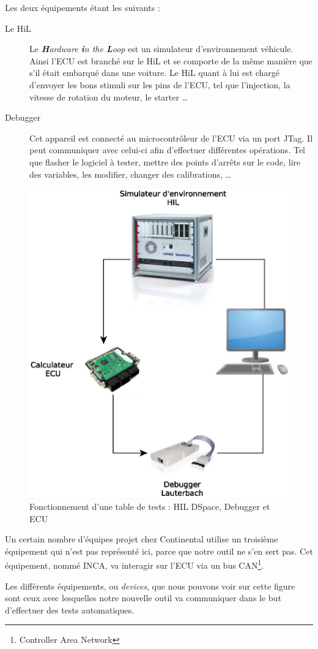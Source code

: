 		Les deux équipements étant les suivants : 
		\begin{description}
			\item[Le HiL] Le \textit{\textbf{H}ardware \textbf{i}n the \textbf{L}oop} est un simulateur d'environnement véhicule. Ainsi l'ECU est branché sur le HiL et se comporte de la même manière que s'il était embarqué dans une voiture. Le HiL quant à lui est chargé d'envoyer les bons stimuli sur les pins de l'ECU, tel que l'injection, la vitesse de rotation du moteur, le starter \ldots
			\item[Debugger] Cet {appareil} est connecté au microcontrôleur de l'ECU via un port JTag. Il peut communiquer avec celui-ci afin d'effectuer différentes opérations. Tel que flasher le logiciel à tester, mettre des points d'arrêts sur le code, lire des variables, les modifier, changer des calibrations, \ldots
		\end{description}
	
		\begin{figure}[H]
			\centering
			\includegraphics[width=12.1cm]{contents/images/WB.eps}
			\caption{Fonctionnement d'une table de tests : HIL DSpace, Debugger et ECU}
			\label{fig:wb}
		\end{figure}
				\begin{remarque}
					Un certain nombre d'équipes projet chez Continental utilise un troisième équipement qui n'est pas représenté ici, parce que notre outil ne s'en sert pas. Cet équipement, nommé INCA, va interagir sur l'ECU via un bus CAN\footnote{Controller Area Network}.
				\end{remarque}
		Les différents équipements, ou \textit{devices}, que nous pouvons voir sur cette figure sont ceux avec lesquelles notre nouvelle outil va communiquer dans le but d'effectuer des tests automatiques. 
		

